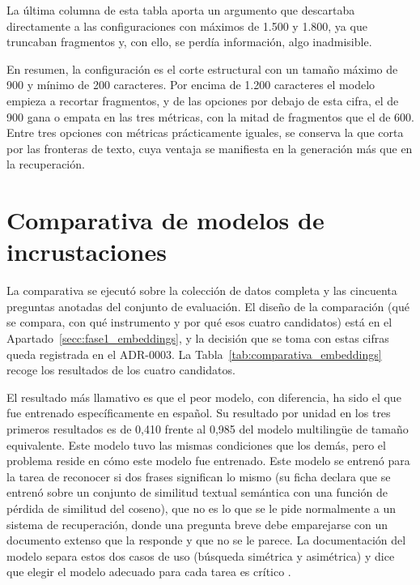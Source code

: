 La última columna de esta tabla aporta un argumento que descartaba directamente a las configuraciones con máximos de 1.500 y 1.800, ya que truncaban fragmentos y, con ello, se perdía información, algo inadmisible.

En resumen, la configuración es el corte estructural con un tamaño máximo de 900 y mínimo de 200 caracteres. Por encima de 1.200 caracteres el modelo empieza a recortar fragmentos, y de las opciones por debajo de esta cifra, el de 900 gana o empata en las tres métricas, con la mitad de fragmentos que el de 600. Entre tres opciones con métricas prácticamente iguales, se conserva la que corta por las fronteras de texto, cuya ventaja se manifiesta en la generación más que en la recuperación.

\section{Comparativa de modelos de incrustaciones}
\label{secc:resultados_embeddings}

La comparativa se ejecutó sobre la colección de datos completa y las cincuenta preguntas anotadas del conjunto de evaluación. El diseño de la comparación (qué se compara, con qué instrumento y por qué esos cuatro candidatos) está en el Apartado~\ref{secc:fase1_embeddings}, y la decisión que se toma con estas cifras queda registrada en el ADR-0003\cite{repo_tfg}. La Tabla~\ref{tab:comparativa_embeddings} recoge los resultados de los cuatro candidatos.

El resultado más llamativo es que el peor modelo, con diferencia, ha sido el que fue entrenado específicamente en español. Su resultado por unidad en los tres primeros resultados es de 0,410 frente al 0,985 del modelo multilingüe de tamaño equivalente. Este modelo tuvo las mismas condiciones que los demás, pero el problema reside en cómo este modelo fue entrenado. Este modelo se entrenó para la tarea de reconocer si dos frases significan lo mismo (su ficha declara que se entrenó sobre un conjunto de similitud textual semántica con una función de pérdida de similitud del coseno\cite{hiiamsid_sts_es}), que no es lo que se le pide normalmente a un sistema de recuperación, donde una pregunta breve debe emparejarse con un documento extenso que la responde y que no se le parece. La documentación del modelo separa estos dos casos de uso (búsqueda simétrica y asimétrica) y dice que elegir el modelo adecuado para cada tarea es crítico \cite{sbert_busqueda_semantica}.



